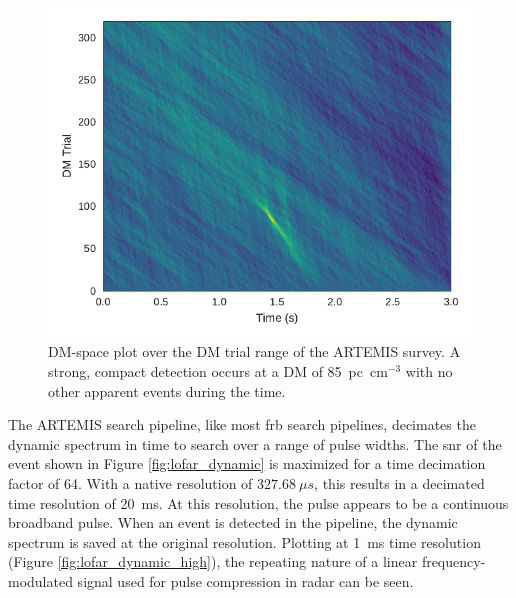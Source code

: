 \documentclass[a4paper,fleqn,usenatbib]{mnras}
\begin{document}
\begin{figure}
    \includegraphics[width=1.0\linewidth]{figures/LOFAR_dm_time.pdf}
    \caption{DM-space plot over the DM trial range of the ARTEMIS survey. A
    strong, compact detection occurs at a DM of 85~pc~cm$^{-3}$ with no other
    apparent events during the time.
    }
    \label{fig:lofar_dm_time}
\end{figure}

The ARTEMIS search pipeline, like most \gls{frb} search pipelines, decimates the
dynamic spectrum in time to search over a range of pulse widths. The \gls{snr}
of the event shown in Figure \ref{fig:lofar_dynamic} is maximized for a time
decimation factor of 64. With a native resolution of $327.68~\mu s$, this
results in a decimated time resolution of 20~ms. At this resolution, the pulse
appears to be a continuous broadband pulse. When an event is detected in the
pipeline, the dynamic spectrum is saved at the original resolution. Plotting at
1~ms time resolution (Figure \ref{fig:lofar_dynamic_high}), the repeating nature
of a linear frequency-modulated signal used for pulse compression in radar can
be seen.
\end{document}
